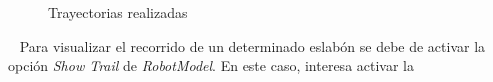 \begin{figure} [ht!]
    \centering  
    \hspace{2cm}
    \hspace{2cm}
    \hspace{2cm}
    \caption{Trayectorias realizadas}
    \label{fig:trayectorias}
\end{figure}\ 
\newpage
Para visualizar el recorrido de un determinado eslabón se debe de activar la opción \textit{Show Trail} de \textit{RobotModel}. En este caso, interesa activar la 
